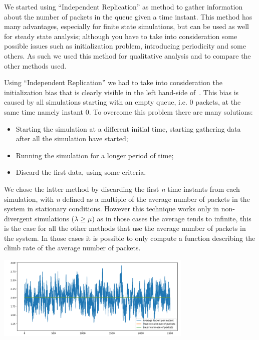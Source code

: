 \documentclass[10pt,a4paper]{article}
\begin{document}
We started using ``Independent Replication'' as method to gather information about the number of packets in the queue given a time instant. This method has many advantages, especially for finite state simulations, but can be used as well for steady state analysis; although you have to take into consideration some possible issues such as initialization problem, introducing periodicity and some others. As such we used this method for qualitative analysis and to compare the other methods used.


Using ``Independent Replication'' we had to take into consideration the initialization bias that is clearly visible in the left hand-side of~. This bias is caused by all simulations starting with an empty queue, i.e. 0 packets, at the same time namely instant 0. To overcome this problem there are many solutions:
\begin{itemize}
\item Starting the simulation at a different initial time, starting gathering data after all the simulation have started;
\item Running the simulation for a longer period of time;
\item Discard the first data, using some criteria.
\end{itemize}

We chose the latter method by discarding the first \emph{n} time instants from each simulation, with \emph{n} defined as a multiple of the average number of packets in the system in stationary conditions. However this technique works only in non-divergent simulations (\(\lambda\geq\mu\)) as in those cases the average tends to infinite, this is the case for all the other methods that use the average number of packets in the system. In those cases it is possible to only compute a function describing the climb rate of the average number of packets.

\begin{center}
  \includegraphics[width=0.7\textwidth]{independent-replication-without-bias.png}
  \label{fig:independent-replication-without-bias}
\end{center}
\end{document}
